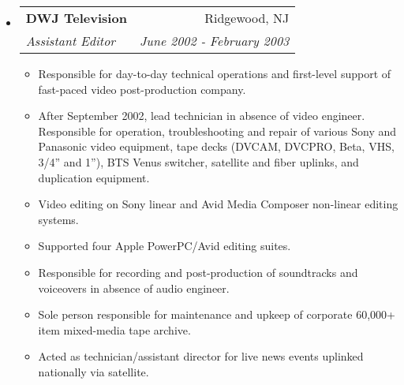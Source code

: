 \documentclass[letterpaper,11pt]{article}
\makeatletter
\newcommand{\resitem}[1]{\item #1 \vspace{-2pt}}
\newcommand{\ressubheading}[4]{
\begin{tabular*}{7.0in}{l@{\extracolsep{\fill}}r}
		\textbf{#1} & #2 \\
		\textit{#3} & \textit{#4} \\
\end{tabular*}\vspace{-6pt}}
\makeatother
\begin{document}
\begin{itemize}
\item
        \ressubheading{DWJ Television}{Ridgewood, NJ}{Assistant Editor}{June 2002 - February 2003}
        \begin{itemize}
                \resitem{Responsible for day-to-day technical operations and
                  first-level support of fast-paced video post-production
                  company.}
                \resitem{After September 2002, lead technician in
                  absence of video engineer. Responsible for operation,
                  troubleshooting and repair of various Sony and Panasonic video equipment,
                  tape decks (DVCAM, DVCPRO, Beta, VHS, 3/4'' and 1''), BTS
                  Venus switcher, satellite and fiber uplinks, and duplication
                  equipment.}
                \resitem{Video editing on Sony linear and Avid Media Composer
                  non-linear editing systems.}
                \resitem{Supported four Apple PowerPC/Avid editing suites.}
                \resitem{Responsible for recording and post-production of
                  soundtracks and voiceovers in absence of audio engineer.}
                \resitem{Sole person responsible for maintenance and upkeep of corporate
                  60,000+ item mixed-media tape archive.}
                \resitem{Acted as technician/assistant director for live
                  news events uplinked nationally via satellite.}
        \end{itemize}

\end{itemize}
\end{document}
